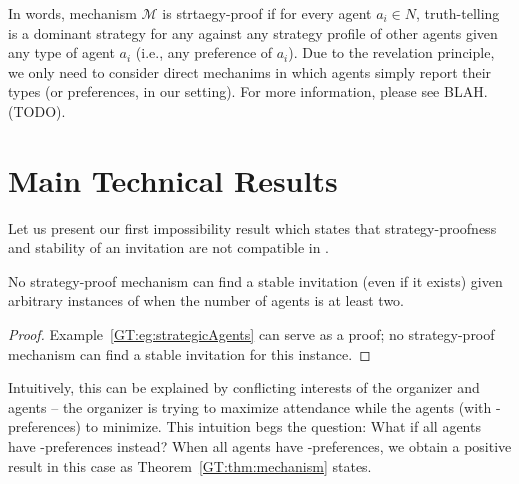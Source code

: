 In words, mechanism $\mathcal{M}$ is strtaegy-proof if for every agent $a_i\in N$, truth-telling is a dominant strategy for any against any strategy profile of other agents given any type of agent $a_i$ (i.e., any preference of $a_i$). Due to the revelation principle, we only need to consider direct mechanims in which agents simply report their types (or preferences, in our setting). For more information, please see BLAH. (TODO).


\section{Main Technical Results} \label{GT:sec:Mechanism}

Let us present our first impossibility result which states that strategy-proofness and stability of an invitation are not compatible in \ASIP. 

\begin{theorem} \label{GT:thm:impossibility}
No strategy-proof mechanism can find a stable invitation (even if it exists) given arbitrary instances of \ASIPs when the number of agents is at least two.
\end{theorem}
\begin{proof}
Example~\ref{GT:eg:strategicAgents} can serve as a proof; no strategy-proof mechanism can find a stable invitation for this instance.
\end{proof}

Intuitively, this can be explained by conflicting interests of the organizer and agents -- the organizer is trying to maximize attendance while the agents (with \DEC-preferences) to minimize. 
This intuition begs the question: What if all agents have \INC-preferences instead? When all agents have \INC-preferences, we obtain a positive result in this case as Theorem~\ref{GT:thm:mechanism} states. 

